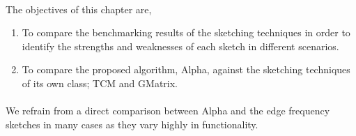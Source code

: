 \paragraph{}
The objectives of this chapter are,

\begin{enumerate}
    \item To compare the benchmarking results of the sketching techniques in order to identify the strengths and weaknesses of each sketch in different scenarios.
    \item To compare the proposed algorithm, Alpha, against the sketching techniques of its own class; TCM and GMatrix.
\end{enumerate}

\paragraph{}
We refrain from a direct comparison between Alpha and the edge frequency sketches in many cases as they vary highly in functionality.